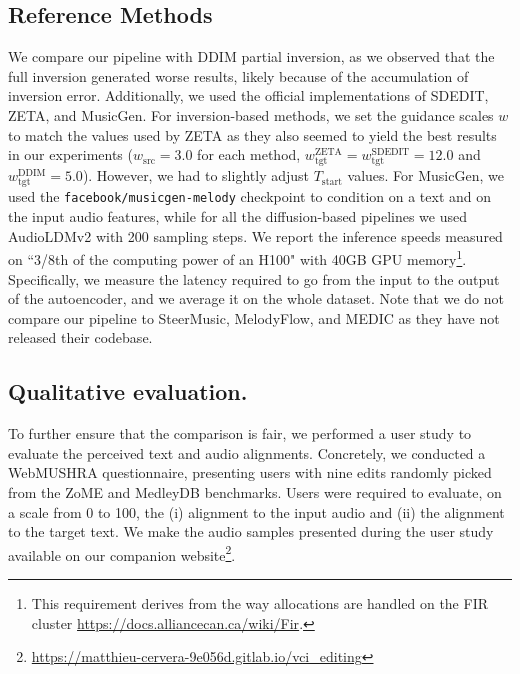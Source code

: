 \subsection{Reference Methods}
We compare our pipeline with DDIM partial inversion, as we observed that the full inversion generated worse results, likely because of the accumulation of inversion error. Additionally, we used the official implementations of SDEDIT, ZETA, and MusicGen. For inversion-based methods, we set the guidance scales $w$ to match the values used by ZETA as they also seemed to yield the best results in our experiments ($w_\text{src}= 3.0$ for each method, $w_\text{tgt}^\text{ZETA}=w_\text{tgt}^\text{SDEDIT}=12.0$ and $w_\text{tgt}^\text{DDIM}=5.0$). However, we had to slightly adjust $T_\text{start}$ values. For MusicGen, we used the \texttt{facebook/musicgen-melody} checkpoint to condition on a text and on the input audio features, while for all the diffusion-based pipelines we used AudioLDMv2\cite{Liu2023AudioLDM2L} with 200 sampling steps. We report the inference speeds measured on ``3/8th of the computing power of an H100" with 40GB GPU memory\footnote{This requirement derives from the way allocations are handled on the FIR cluster \url{https://docs.alliancecan.ca/wiki/Fir}.}. Specifically, we measure the latency required to go from the input to the output of the autoencoder, and we average it on the whole dataset. Note that we do not compare our pipeline to SteerMusic, MelodyFlow, and MEDIC as they have not released their codebase.


\newcommand{\alignedunderline}[1]{
  \makebox[0pt][c]{\underline{\makebox[\widthof{\num{#1}}][c]{\num{#1}}}}
}

\subsection{Qualitative evaluation.}

To further ensure that the comparison is fair, we performed a user study to evaluate the perceived text and audio alignments. Concretely, we conducted a WebMUSHRA \cite{Schoeffler-2018} questionnaire, presenting users with nine edits randomly picked from the ZoME and MedleyDB benchmarks. Users were required to evaluate, on a scale from 0 to 100, the (i) alignment to the input audio and (ii) the alignment to the target text. We make the audio samples presented during the user study available on our companion website\footnote{\url{https://matthieu-cervera-9e056d.gitlab.io/vci_editing}}.

